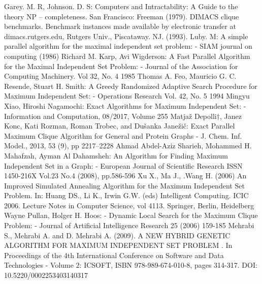 \documentclass[conference]{IEEEtran}
\begin{document}
\begin{thebibliography}{00}
 Garey. M. R, Johnson. D. S: Computers and Intractability: A Guide to the theory NP – completeness. San Francisco: Freeman (1979).  
 DIMACS clique benchmarks. Benchmark instances made available by electronic transfer at dimacs.rutgers.edu, Rutgers Univ., Piscataway. NJ. (1993). 
 Luby. M: A simple parallel algorithm for the maximal independent set problem: - SIAM journal on computing (1986)
 Richard M. Karp, Avi Wigderson: A Fast Parallel Algorithm for the Maximal Independent Set Problem: - Journal of the Association for Computing Machinery. Vol 32, No. 4 1985
 Thomas A. Feo, Mauricio G. C. Resende, Stuart H. Smith: A Greedy Randomized Adaptive Search Procedure for Maximum Independent Set: - Operations Research Vol. 42, No. 5 1994
 Mingyu Xiao, Hiroshi Nagamochi: Exact Algorithms for Maximum Independent Set: - Information and Computation, 08/2017, Volume 255
 Matjaž Depolli†, Janez Konc, Kati Rozman, Roman Trobec, and Dušanka Janežič: Exact Parallel Maximum Clique Algorithm for General and Protein Graphs - J. Chem. Inf. Model., 2013, 53 (9), pp 2217–2228
 Ahmad Abdel-Aziz Sharieh, Mohammed H. Mahafzah, Ayman Al Dahamsheh: An Algorithm for Finding Maximum Independent Set in a Graph: - European Journal of Scientific Research ISSN 1450-216X Vol.23 No.4 (2008), pp.586-596
 Xu X., Ma J., .Wang H. (2006) An Improved Simulated Annealing Algorithm for the Maximum Independent Set Problem. In: Huang DS., Li K., Irwin G.W. (eds) Intelligent Computing. ICIC 2006. Lecture Notes in Computer Science, vol 4113. Springer, Berlin, Heidelberg
 Wayne Pullan, Holger H. Hoos: - Dynamic Local Search for the Maximum Clique Problem: - Journal of Artificial Intelligence Research 25 (2006) 159-185
 Mehrabi S., Mehrabi A. and D. Mehrabi A. (2009). A NEW HYBRID GENETIC ALGORITHM FOR MAXIMUM INDEPENDENT SET PROBLEM . In Proceedings of the 4th International Conference on Software and Data Technologies - Volume 2: ICSOFT, ISBN 978-989-674-010-8, pages 314-317. DOI: 10.5220/0002253403140317
\end{thebibliography}
\end{document}
